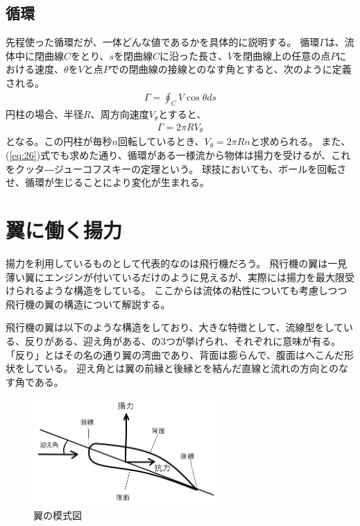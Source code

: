 \documentclass[10pt,b5paper,papersize,dvipdfmx]{jsbook}
\begin{document}
\subsection{循環}
先程使った循環だが、一体どんな値であるかを具体的に説明する。
循環$\Gamma$は、流体中に閉曲線$C$をとり、$s$を閉曲線$C$に沿った長さ、$V$を閉曲線上の任意の点$P$における速度、$\theta$を$V$と点$P$での閉曲線の接線とのなす角とすると、次のように定義される。
\begin{align}
  \Gamma = \oint_C V\cos\theta ds
\end{align}
円柱の場合、半径$R$、周方向速度$V_\theta$とすると、
\begin{align}
  \Gamma = 2\pi RV_\theta
\end{align}
となる。この円柱が毎秒$n$回転しているとき、$V_\theta = 2\pi Rn$と求められる。
また、(\ref{eq:26})式でも求めた通り、循環がある一様流から物体は揚力を受けるが、これをクッタ―ジューコフスキーの定理という。
球技においても、ボールを回転させ、循環が生じることにより変化が生まれる。

\section{翼に働く揚力}
揚力を利用しているものとして代表的なのは飛行機だろう。
飛行機の翼は一見薄い翼にエンジンが付いているだけのように見えるが、実際には揚力を最大限受けられるような構造をしている。
ここからは流体の粘性についても考慮しつつ飛行機の翼の構造について解説する。
\par
飛行機の翼は以下のような構造をしており、大きな特徴として、流線型をしている、反りがある、迎え角がある、の3つが挙げられ、それぞれに意味が有る。
「反り」とはその名の通り翼の湾曲であり、背面は膨らんで、腹面はへこんだ形状をしている。
迎え角とは翼の前縁と後縁とを結んだ直線と流れの方向とのなす角である。
\vspace{2zw} %
\begin{figure}[ht]
  \centering
  \includegraphics[width=70mm]{img/ryuutai4.png}
  \caption{翼の模式図}
\end{figure}
\end{document}
